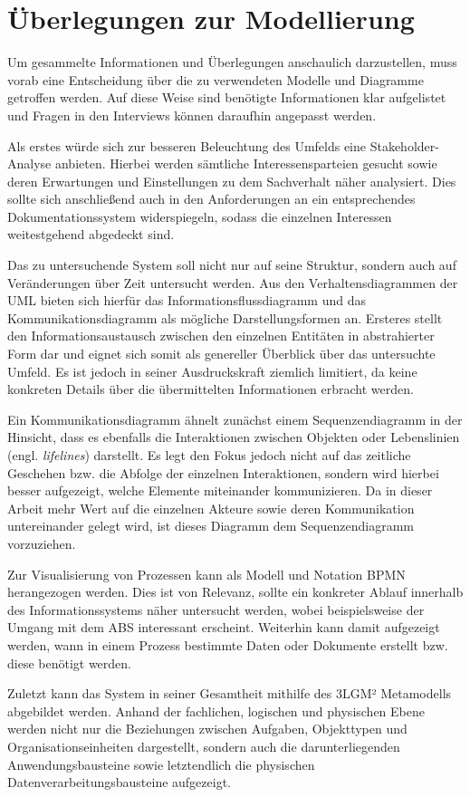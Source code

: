 \section{Überlegungen zur Modellierung}

Um gesammelte Informationen und Überlegungen anschaulich darzustellen, muss vorab eine Entscheidung über die zu verwendeten Modelle und Diagramme getroffen werden. Auf diese Weise sind benötigte Informationen klar aufgelistet und Fragen in den Interviews können daraufhin angepasst werden.

Als erstes würde sich zur besseren Beleuchtung des Umfelds eine Stakeholder-Analyse anbieten. Hierbei werden sämtliche Interessensparteien gesucht sowie deren Erwartungen und Einstellungen zu dem Sachverhalt näher analysiert. Dies sollte sich anschließend auch in den Anforderungen an ein entsprechendes Dokumentationssystem widerspiegeln, sodass die einzelnen Interessen weitestgehend abgedeckt sind.

Das zu untersuchende System soll nicht nur auf seine Struktur, sondern auch auf Veränderungen über Zeit untersucht werden. Aus den Verhaltensdiagrammen der UML bieten sich hierfür das Informationsflussdiagramm und das Kommunikationsdiagramm als mögliche Darstellungsformen an. Ersteres stellt den Informationsaustausch zwischen den einzelnen Entitäten in abstrahierter Form dar und eignet sich somit als genereller Überblick über das untersuchte Umfeld. Es ist jedoch in seiner Ausdruckskraft ziemlich limitiert, da keine konkreten Details über die übermittelten Informationen erbracht werden.

Ein Kommunikationsdiagramm ähnelt zunächst einem Sequenzendiagramm in der Hinsicht, dass es ebenfalls die Interaktionen zwischen Objekten oder Lebenslinien (engl. \textit{lifelines}) darstellt. Es legt den Fokus jedoch nicht auf das zeitliche Geschehen bzw. die Abfolge der einzelnen Interaktionen, sondern wird hierbei besser aufgezeigt, welche Elemente miteinander kommunizieren. Da in dieser Arbeit mehr Wert auf die einzelnen Akteure sowie deren Kommunikation untereinander gelegt wird, ist dieses Diagramm dem Sequenzendiagramm vorzuziehen.

Zur Visualisierung von Prozessen kann als Modell und Notation BPMN herangezogen werden. Dies ist von Relevanz, sollte ein konkreter Ablauf innerhalb des Informationssystems näher untersucht werden, wobei beispielsweise der Umgang mit dem ABS interessant erscheint. Weiterhin kann damit aufgezeigt werden, wann in einem Prozess bestimmte Daten oder Dokumente erstellt bzw. diese benötigt werden.

Zuletzt kann das System in seiner Gesamtheit mithilfe des 3LGM² Metamodells abgebildet werden. Anhand der fachlichen, logischen und physischen Ebene werden nicht nur die Beziehungen zwischen Aufgaben, Objekttypen und Organisationseinheiten dargestellt, sondern auch die darunterliegenden Anwendungsbausteine sowie letztendlich die physischen Datenverarbeitungsbausteine aufgezeigt.

